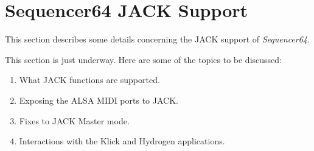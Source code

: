 %
%
%

\section{Sequencer64 JACK Support}
\label{sec:seq64_jack}

   This section describes some details concerning the JACK support of
   \textsl{Sequencer64}.

   This section is just underway.  Here are some of the topics to be discussed:

   \begin{enumerate}
      \item What JACK functions are supported.
      \item Exposing the ALSA MIDI ports to JACK.
      \item Fixes to JACK Master mode.
      \item Interactions with the Klick and Hydrogen applications.
   \end{enumerate}


